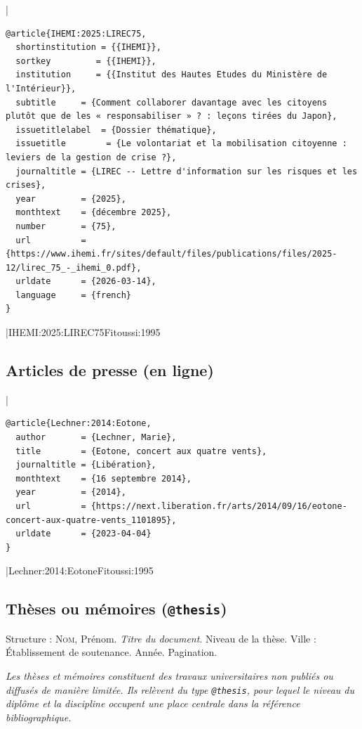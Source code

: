 \documentclass{article}
\begin{document}
|
\begin{verbatim}
@article{IHEMI:2025:LIREC75,
  shortinstitution = {{IHEMI}},
  sortkey         = {{IHEMI}},
  institution     = {{Institut des Hautes Etudes du Ministère de l'Intérieur}},
  subtitle     = {Comment collaborer davantage avec les citoyens plutôt que de les « responsabiliser » ? : leçons tirées du Japon},
  issuetitlelabel  = {Dossier thématique},
  issuetitle        = {Le volontariat et la mobilisation citoyenne : leviers de la gestion de crise ?},
  journaltitle = {LIREC -- Lettre d'information sur les risques et les crises},
  year         = {2025},
  monthtext    = {décembre 2025},
  number       = {75},
  url          = {https://www.ihemi.fr/sites/default/files/publications/files/2025-12/lirec_75_-_ihemi_0.pdf},
  urldate      = {2026-03-14},
  language     = {french}
}
\end{verbatim}
|{IHEMI:2025:LIREC75}{Fitoussi:1995}

\subsection{Articles de presse (en ligne)}

|
\begin{verbatim}
@article{Lechner:2014:Eotone,
  author       = {Lechner, Marie},
  title        = {Eotone, concert aux quatre vents},
  journaltitle = {Libération},
  monthtext    = {16 septembre 2014},
  year         = {2014},
  url          = {https://next.liberation.fr/arts/2014/09/16/eotone-concert-aux-quatre-vents_1101895},
  urldate      = {2023-04-04}
}
\end{verbatim}
|{Lechner:2014:Eotone}{Fitoussi:1995}

\subsection{Thèses ou mémoires (\texttt{@thesis})}

Structure : \textsc{Nom}, Prénom. \textit{Titre du document}. Niveau de la thèse. Ville : Établissement de soutenance. Année. Pagination.

\emph{Les thèses et mémoires constituent des travaux universitaires non publiés
	ou diffusés de manière limitée. Ils relèvent du type \texttt{@thesis}, pour lequel
	le niveau du diplôme et la discipline occupent une place centrale dans la
	référence bibliographique.}
\end{document}

